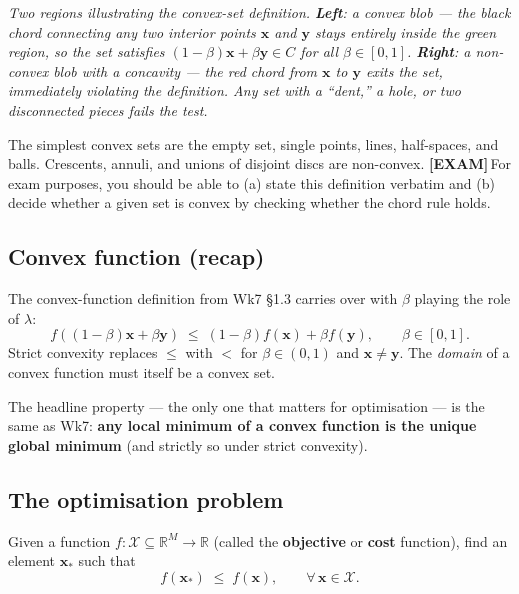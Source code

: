 \documentclass[11pt, a4paper]{article}
\newcommand{\examflag}{\textcolor{tipBd}{\textbf{[EXAM]}}\,}
\begin{document}
\begin{center}

\footnotesize\textit{Two regions illustrating the convex-set definition. \textbf{Left}: a convex blob --- the black chord connecting any two interior points $\mathbf{x}$ and $\mathbf{y}$ stays entirely inside the green region, so the set satisfies $(1-\beta)\mathbf{x}+\beta\mathbf{y}\in C$ for all $\beta\in[0,1]$. \textbf{Right}: a non-convex blob with a concavity --- the red chord from $\mathbf{x}$ to $\mathbf{y}$ exits the set, immediately violating the definition. Any set with a ``dent,'' a hole, or two disconnected pieces fails the test.}
\end{center}

The simplest convex sets are the empty set, single points, lines, half-spaces, and balls. Crescents, annuli, and unions of disjoint discs are non-convex. \examflag{}For exam purposes, you should be able to (a) state this definition verbatim and (b) decide whether a given set is convex by checking whether the chord rule holds.

\subsection{Convex function (recap)}

The convex-function definition from Wk7 §1.3 carries over with $\beta$ playing the role of $\lambda$:
\[
f((1-\beta)\mathbf{x} + \beta\mathbf{y}) \;\le\; (1-\beta)f(\mathbf{x}) + \beta f(\mathbf{y}), \qquad \beta\in[0,1].
\]
Strict convexity replaces $\le$ with $<$ for $\beta\in(0,1)$ and $\mathbf{x}\ne\mathbf{y}$. The \emph{domain} of a convex function must itself be a convex set.

The headline property — the only one that matters for optimisation — is the same as Wk7: \textbf{any local minimum of a convex function is the unique global minimum} (and strictly so under strict convexity).

\subsection{The optimisation problem}

\begin{defbox}
Given a function $f : \mathcal{X} \subseteq \mathbb{R}^M \to \mathbb{R}$ (called the \textbf{objective} or \textbf{cost} function), find an element $\mathbf{x}_*$ such that
\[
f(\mathbf{x}_*) \;\le\; f(\mathbf{x}), \qquad \forall\,\mathbf{x}\in\mathcal{X}.
\]
\end{defbox}
\end{document}
